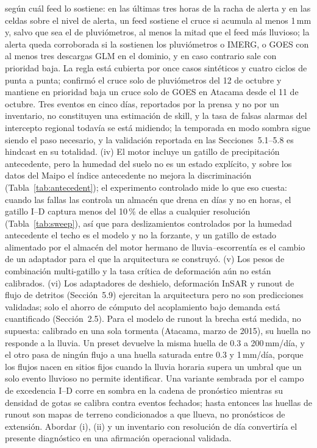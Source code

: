 \documentclass[authoryear,preprint,review,12pt]{elsarticle}
\begin{document}
según cuál feed lo sostiene: en las últimas tres horas de la racha de alerta y en las
celdas sobre el nivel de alerta, un feed sostiene el cruce si acumula al menos 1\,mm y,
salvo que sea el de pluviómetros, al menos la mitad que el feed más lluvioso; la alerta
queda corroborada si la sostienen los pluviómetros o IMERG, o GOES con al menos tres
descargas GLM en el dominio, y en caso contrario sale con prioridad baja. La regla está
cubierta por once casos sintéticos y cuatro ciclos de punta a punta; confirmó el cruce
solo de pluviómetros del 12 de octubre y mantiene en prioridad baja un cruce solo de
GOES en Atacama desde el 11 de octubre. Tres eventos en cinco días, reportados
por la prensa y no por un inventario, no constituyen una estimación de skill, y la
tasa de falsas alarmas del intercepto regional todavía se está midiendo; la
temporada en modo sombra sigue siendo el paso necesario, y la validación reportada
en las Secciones~5.1--5.8 es hindcast en su totalidad. (iv) El motor incluye un gatillo de precipitación antecedente, pero la humedad del
suelo no es un estado explícito, y sobre los datos del Maipo el índice antecedente no
mejora la discriminación (Tabla~\ref{tab:antecedent}); el experimento controlado mide lo que eso cuesta: cuando las fallas las controla un almacén que drena en días y no en horas, el gatillo I--D captura menos del 10\,\% de ellas a cualquier resolución (Tabla~\ref{tab:sweep}), así que para deslizamientos controlados por la humedad antecedente el techo es el modelo y no la forzante, y un gatillo de estado alimentado por el almacén del motor hermano de lluvia--escorrentía es el cambio de un adaptador para el que la arquitectura se construyó. (v) Los pesos de combinación
multi-gatillo y la tasa crítica de deformación aún no están calibrados. (vi) Los
adaptadores de deshielo, deformación InSAR y runout de flujo de detritos
(Sección~5.9) ejercitan la arquitectura pero no son predicciones validadas; solo el
ahorro de cómputo del acoplamiento bajo demanda está cuantificado (Sección~2.5).
Para el modelo de runout la brecha está medida, no supuesta: calibrado en una sola
tormenta (Atacama, marzo de 2015), su huella no responde a la lluvia. Un preset
devuelve la misma huella de 0.3 a 200\,mm/día, y el otro pasa de ningún flujo a una
huella saturada entre 0.3 y 1\,mm/día, porque los flujos nacen en sitios fijos
cuando la lluvia horaria supera un umbral que un solo evento lluvioso no permite
identificar. Una variante sembrada por el campo de excedencia I--D corre en sombra
en la cadena de pronóstico mientras su densidad de gotas se calibra contra eventos
fechados; hasta entonces las huellas de runout son mapas de terreno condicionados a
que llueva, no pronósticos de extensión.
Abordar (i), (ii) y un inventario con resolución de día convertiría el presente
diagnóstico en una afirmación operacional validada.
\end{document}
